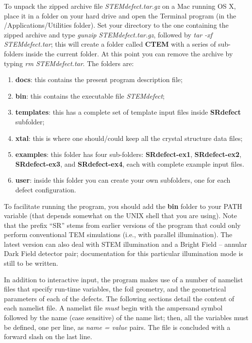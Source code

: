 \documentclass[11pt]{article}
\begin{document}
To unpack the zipped archive file \textit{STEMdefect.tar.gz} on a Mac running OS X, place it in a folder on your hard drive and open the Terminal program (in the 
/Applications/Utilities folder).  Set your directory to the one containing the zipped archive and type \textit{gunzip STEMdefect.tar.gz}, followed by \textit{tar -xf STEMdefect.tar};
this will create a folder called \textbf{CTEM} with a series of sub-folders inside the current folder. At this point you can remove the archive by typing \textit{rm STEMdefect.tar}. The folders are:
\begin{enumerate}
	\item \textbf{docs}: this contains the present program description file;
	\item \textbf{bin}:  this contains the executable file \textit{STEMdefect};
	\item \textbf{templates}: this has a complete set of template input files inside 
	\textbf{SRdefect} subfolder;
	\item \textbf{xtal}: this is where one should/could keep all the crystal structure data files;
	\item \textbf{examples}: this folder has four sub-folders: \textbf{SRdefect-ex1}, \textbf{SRdefect-ex2}, \textbf{SRdefect-ex3}, and \textbf{SRdefect-ex4}, each with complete example input files.
	\item \textbf{user}: inside this folder you can create your own subfolders, one for each defect configuration.
\end{enumerate}
To facilitate running the program, you should add the \textbf{bin} folder to your PATH variable (that depends somewhat on the UNIX shell that you are using).  Note that the 
prefix ``SR'' stems from earlier versions of the program that could only perform conventional TEM simulations (i.e., with parallel illumination).  The latest version
can also deal with STEM illumination and a Bright Field -- annular Dark Field detector pair; documentation for this particular illumination mode is still to be written.

In addition to interactive input, the program makes use of a number of namelist files that specify run-time variables, the foil geometry, and the geometrical 
parameters of each of the defects.  The following sections detail the content of each namelist file.  A namelist file \textit{must} begin with the ampersand symbol
followed by the name (case sensitive) of the name list; then, all the variables must be defined, one per line, as \textit{name = value} pairs.  The file is concluded
with a forward slash on the last line.
\end{document}
